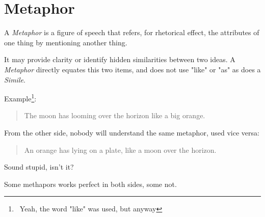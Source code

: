 \section{Metaphor}
\label{sec:Metaphor}

A \emph{Metaphor} is a figure of speech that refers, for rhetorical effect, the attributes of one thing by mentioning another thing.

It may provide clarity or identify hidden similarities between two ideas. A \textit{Metaphor} directly equates this two items, and does not use "like" or "as" as does a \textit{Simile}. 

Example\footnote{~Yeah, the word "like" was used, but anyway}: 

\begin{verse}
The moon has looming over the horizon like a big orange. 
\end{verse} 

From the other side, nobody will understand the same metaphor, used vice versa:

\begin{verse}
An orange has lying on a plate, like a moon over the horizon. 
\end{verse} 

Sound stupid, isn't it?

Some methapors works perfect in both sides, some not.
